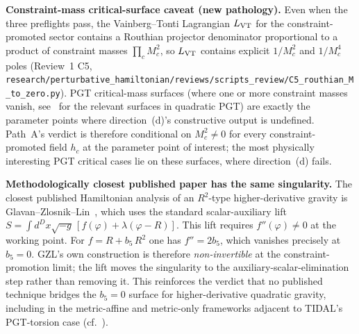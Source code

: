 \noindent
\textbf{Constraint-mass critical-surface caveat (new pathology).}
Even when the three preflights pass, the Vainberg--Tonti Lagrangian
$L_{\rm VT}$ for the constraint-promoted sector contains a Routhian
projector denominator proportional to a product of constraint masses
$\prod_c M_c^2$, so $L_{\rm VT}$ contains explicit $1/M_c^2$ and
$1/M_c^4$ poles (Review~1 C5,
\texttt{research/perturbative\_hamiltonian/reviews/scripts\_review/C5\_routhian\_M\_to\_zero.py}).
PGT critical-mass surfaces (where one or more
constraint masses vanish, see~\cite{BlagojevicCvetkovic2018} for the
relevant surfaces in quadratic PGT) are exactly the parameter points
where direction~(d)'s constructive output is undefined.  Path~A's
verdict is therefore conditional on $M_c^2 \neq 0$ for every
constraint-promoted field $h_c$ at the parameter point of interest;
the most physically interesting PGT critical cases lie on these
surfaces, where direction~(d) fails.

\noindent
\textbf{Methodologically closest published paper has the same singularity.}
The closest published Hamiltonian analysis of an $R^2$-type higher-derivative
gravity is Glavan--Zlosnik--Lin~\cite{GlavanZlosnikLin2024}, which uses the
standard scalar-auxiliary lift $S = \int d^Dx\sqrt{-g}\,[f(\varphi) +
\lambda(\varphi - R)]$.  This lift requires $f''(\varphi) \neq 0$ at the
working point.  For $f = R + b_5\, R^2$ one has $f'' = 2 b_5$, which
vanishes precisely at $b_5 = 0$.  GZL's own construction is therefore
\emph{non-invertible} at the constraint-promotion limit; the lift moves
the singularity to the auxiliary-scalar-elimination step rather than
removing it.  This reinforces the verdict that no published technique
bridges the $b_5 = 0$ surface for higher-derivative quadratic gravity,
including in the metric-affine and metric-only frameworks adjacent to
TIDAL's PGT-torsion case (cf.~\cite{BarkerGlavan2025,Bellorin2025,Karananas2024a,Karananas2024b}).

